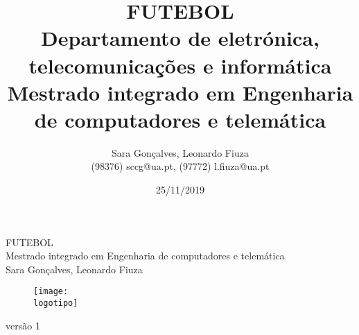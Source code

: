 \documentclass[a4paper,12pt]{report}
\begin{document}
%
\def\titulo{FUTEBOL}
\def\data{25/11/2019}
\def\autores{Sara Gonçalves, Leonardo Fiuza}
\def\autorescontactos{(98376) sccg@ua.pt, (97772) l.fiuza@ua.pt}
\def\versao{versão 1}
\def\departamento{Departamento de eletrónica, telecomunicações e informática}
\def\empresa{Mestrado integrado em Engenharia de computadores e telemática}
\def\logotipo{ua.pdf}
%
%
\begin{titlepage}

\begin{center}
%
\vspace*{50mm}
%
{\Huge \titulo}\\ 
%
\vspace{10mm}
%
{\Large \empresa}\\
%
\vspace{10mm}
%
{\LARGE \autores}\\ 
%
\vspace{30mm}
%
\begin{figure}[h]
\center
\texttt{[image: \\logotipo]}
\end{figure}
%
\vspace{30mm}
\end{center}
%
\begin{flushright}
\versao
\end{flushright}
\end{titlepage}

\title{%
{\Huge\textbf{\titulo}}\\
{\Large \departamento\\ \empresa}
}
%
\author{%
    \autores \\
    \autorescontactos
}
%
\date{\data}
%
\maketitle

\end{document}
